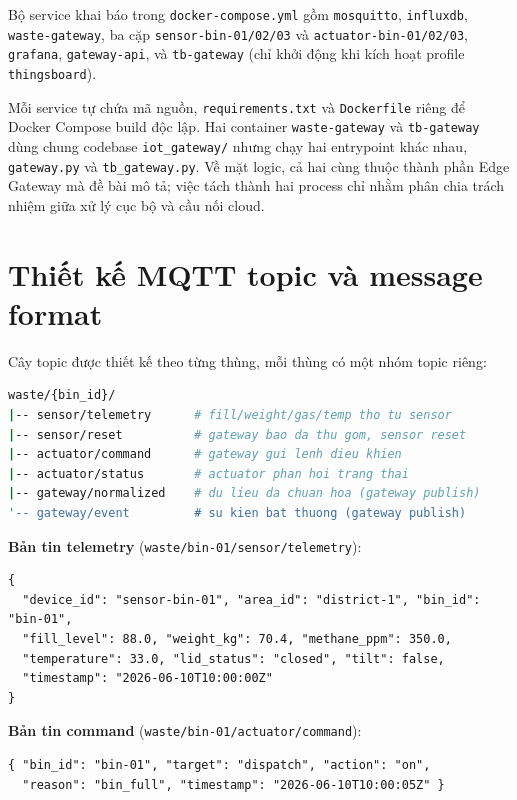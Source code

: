 \documentclass[12pt,a4paper]{article}
\begin{document}
Bộ service khai báo trong \texttt{docker-compose.yml} gồm \texttt{mosquitto}, \texttt{influxdb}, \texttt{waste-gateway}, ba cặp \texttt{sensor-bin-01/02/03} và \texttt{actuator-bin-01/02/03}, \texttt{grafana}, \texttt{gateway-api}, và \texttt{tb-gateway} (chỉ khởi động khi kích hoạt profile \texttt{thingsboard}).

Mỗi service tự chứa mã nguồn, \texttt{requirements.txt} và \texttt{Dockerfile} riêng để Docker Compose build độc lập. Hai container \texttt{waste-gateway} và \texttt{tb-gateway} dùng chung codebase \texttt{iot\_gateway/} nhưng chạy hai entrypoint khác nhau, \texttt{gateway.py} và \texttt{tb\_gateway.py}. Về mặt logic, cả hai cùng thuộc thành phần Edge Gateway mà đề bài mô tả; việc tách thành hai process chỉ nhằm phân chia trách nhiệm giữa xử lý cục bộ và cầu nối cloud.

\section{Thiết kế MQTT topic và message format}

Cây topic được thiết kế theo từng thùng, mỗi thùng có một nhóm topic riêng:

\begin{lstlisting}[language=bash,frame=none,numbers=none]
waste/{bin_id}/
|-- sensor/telemetry      # fill/weight/gas/temp tho tu sensor
|-- sensor/reset          # gateway bao da thu gom, sensor reset
|-- actuator/command      # gateway gui lenh dieu khien
|-- actuator/status       # actuator phan hoi trang thai
|-- gateway/normalized    # du lieu da chuan hoa (gateway publish)
'-- gateway/event         # su kien bat thuong (gateway publish)
\end{lstlisting}

\textbf{Bản tin telemetry} (\texttt{waste/bin-01/sensor/telemetry}):
\begin{lstlisting}[language={}]
{
  "device_id": "sensor-bin-01", "area_id": "district-1", "bin_id": "bin-01",
  "fill_level": 88.0, "weight_kg": 70.4, "methane_ppm": 350.0,
  "temperature": 33.0, "lid_status": "closed", "tilt": false,
  "timestamp": "2026-06-10T10:00:00Z"
}
\end{lstlisting}

\textbf{Bản tin command} (\texttt{waste/bin-01/actuator/command}):
\begin{lstlisting}[language={}]
{ "bin_id": "bin-01", "target": "dispatch", "action": "on",
  "reason": "bin_full", "timestamp": "2026-06-10T10:00:05Z" }
\end{lstlisting}
\end{document}
